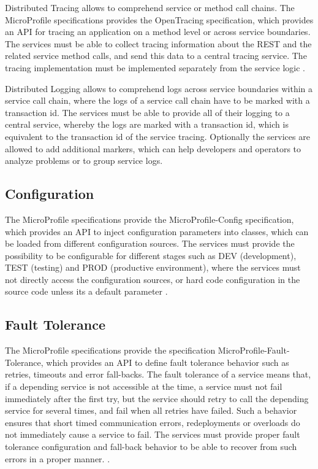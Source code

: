 Distributed Tracing allows to comprehend service or method call chains. The MicroProfile specifications provides the OpenTracing specification, which provides an API for tracing an application on a method level or across service boundaries. The services must be able to collect tracing information about the REST and the related service method calls, and send this data to a central tracing service. The tracing implementation must be implemented separately from the service logic \cite{CNCFOpentracing2018}.

Distributed Logging allows to comprehend logs across service boundaries within a service call chain, where the logs of a service call chain have to be marked with a transaction id. The services must be able to provide all of their logging to a central service, whereby the logs are marked with a transaction id, which is equivalent to the transaction id of the service tracing. Optionally the services are allowed to add additional markers, which can help developers and operators to analyze problems or to group service logs.

\subsection{Configuration}
\label{sec:esboc-requirements-service-config}
The MicroProfile specifications provide the MicroProfile-Config specification, which provides an API to inject configuration parameters into classes, which can be loaded from different configuration sources. The services must provide the possibility to be configurable for different stages such as DEV (development), TEST (testing) and PROD (productive environment), where the services must not directly access the configuration sources, or hard code configuration in the source code unless its a default parameter \cite{EclipseMicroprofileConfig2018}.

\subsection{Fault Tolerance}
\label{sec:esboc-requirements-service-fault}
The MicroProfile specifications provide the specification MicroProfile-Fault-Tolerance, which provides an API to define fault tolerance behavior such as retries, timeouts and error fall-backs. The fault tolerance of a service means that, if a depending service is not accessible at the time, a service must not fail immediately after the first try, but the service should retry to call the depending service for several times, and fail when all retries have failed. Such a behavior ensures that short timed communication errors, redeployments or overloads do not immediately cause a service to fail. The services must provide proper fault tolerance configuration and fall-back behavior to be able to recover from such errors in a proper manner. \cite{EclipseMicroprofileFault2018}.   

